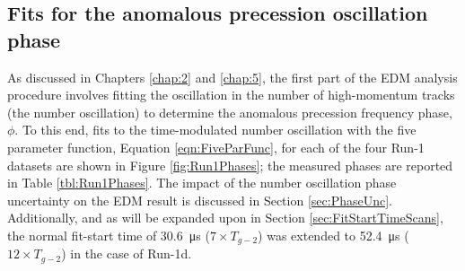 \clearpage

\subsection{Fits for the anomalous precession oscillation phase}


As discussed in Chapters \ref{chap:2} and \ref{chap:5}, the first part of the EDM analysis procedure involves fitting the oscillation in the number of high-momentum tracks (the number oscillation) to determine the anomalous precession frequency phase, $\phi$. To this end, fits to the time-modulated number oscillation with the five parameter function, Equation \ref{eqn:FiveParFunc}, for each of the four Run-1 datasets are shown in Figure \ref{fig:Run1Phases}; the measured phases are reported in Table \ref{tbl:Run1Phases}. The impact of the number oscillation phase uncertainty on the EDM result is discussed in Section \ref{sec:PhaseUnc}. Additionally, and as will be expanded upon in Section \ref{sec:FitStartTimeScans}, the normal fit-start time of \SI{30.6}{\micro\second} ($7\times T_{g-2}$) was extended to \SI{52.4}{\micro\second} ($12\times T_{g-2}$) in the case of Run-1d. 



